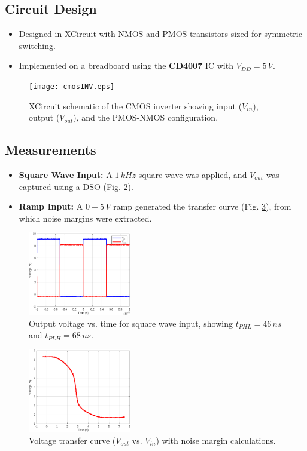 \documentclass[9pt,conference]{IEEEtran}
\begin{document}
\subsection{Circuit Design}
\begin{itemize}
    \item Designed in XCircuit with NMOS and PMOS transistors sized for symmetric switching.
    \item Implemented on a breadboard using the \textbf{CD4007} IC with \(V_{DD} = 5\,V\).
\end{itemize}

\begin{figure}[H]
    \centering
    \texttt{[image: cmosINV.eps]}
    \caption{\label{fig:schematic}XCircuit schematic of the CMOS inverter showing input (\(V_{in}\)), output (\(V_{out}\)), and the PMOS-NMOS configuration.}
\end{figure}

\subsection{Measurements}
\begin{itemize}
    \item \textbf{Square Wave Input:} A \(1\,kHz\) square wave was applied, and \(V_{out}\) was captured using a DSO (Fig. \ref{fig:square_wave}).
    \item \textbf{Ramp Input:} A \(0-5\,V\) ramp generated the transfer curve (Fig. \ref{fig:transfer_curve}), from which noise margins were extracted.
\end{itemize}

\begin{figure}[H]
    \centering
    \includegraphics[width=0.4\textwidth]{square_in.eps}
    \caption{\label{fig:square_wave}Output voltage vs. time for square wave input, showing \(t_{PHL} = 46\,ns\) and \(t_{PLH} = 68\,ns\).}
\end{figure}

\begin{figure}[H]
    \centering
    \includegraphics[width=0.4\textwidth]{ramp_in.eps}
    \caption{\label{fig:transfer_curve}Voltage transfer curve (\(V_{out}\) vs. \(V_{in}\)) with noise margin calculations.}
\end{figure}
\end{document}
